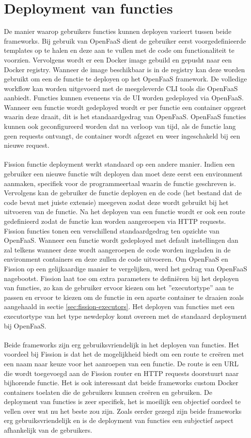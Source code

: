 \section{Deployment van functies}
De manier waarop gebruikers functies kunnen deployen varieert tussen beide frameworks. Bij gebruik van OpenFaaS dient de gebruiker eerst voorgedefinieerde templates op te halen en deze aan te vullen met de code om functionaliteit te voorzien. Vervolgens wordt er een Docker image gebuild en gepusht naar een Docker registry. Wanneer de image beschikbaar is in de registry kan deze worden gebruikt om een de functie te deployen op het OpenFaaS framework. De volledige workflow kan worden uitgevoerd met de meegeleverde CLI tools die OpenFaaS aanbiedt. Functies kunnen eveneens via de UI worden gedeployed via OpenFaaS. Wanneer een functie wordt gedeployed wordt er per functie een container opgezet waarin deze draait, dit is het standaardgedrag van OpenFaaS. OpenFaaS functies kunnen ook geconfigureerd worden dat na verloop van tijd, als de functie lang geen requests ontvangt, de container wordt afgezet en weer ingeschakeld bij een nieuwe request.
\\\\
Fission functie deployment werkt standaard op een andere manier. Indien een gebruiker een nieuwe functie wilt deployen dan moet deze eerst een environment aanmaken, specifiek voor de programmeertaal waarin de functie geschreven is. Vervolgens kan de gebruiker de functie deployen en de code (het bestand dat de code bevat met juiste extensie) meegeven zodat deze wordt gebruikt bij het uitvoeren van de functie. Na het deployen van een functie wordt er ook een route gedefinieerd zodat de functie kan worden aangeroepen via HTTP requests. Fission functies tonen een verschillend standaardgedrag ten opzichte van OpenFaaS. Wanneer een functie wordt gedeployed met default instellingen dan zal telkens wanneer deze wordt aangeroepen de code worden ingeladen in de environment containers en deze zullen de code uitvoeren. Om OpenFaaS en Fission op een gelijkaardige manier te vergelijken, werd het gedrag van OpenFaaS nagebootst. Fission laat toe om extra parameters te definiëren bij het deployen van functies, zo kan de gebruiker ervoor kiezen om het ''executortype'' aan te passen en ervoor te kiezen om de functie in een aparte container te draaien zoals aangehaald in sectie \ref{sec:fission-executors}. Het deployen van functies met een executortype van het type newdeploy komt overeen met de standaard deployment bij OpenFaaS.
\\\\
Beide frameworks zijn erg gebruiksvriendelijk in het deployen van functies. Het voordeel bij Fission is dat het de mogelijkheid biedt om een route te creëren met een naam naar keuze voor het aanroepen van een functie. De route is een URL die wordt toegevoegd aan de Fission router en HTTP requests doorstuurt naar bijhorende functie. Het is ook interessant dat beide frameworks custom Docker containers toelaten die de gebruikers kunnen creëren en gebruiken. 
De deployment van functies is zeer specifiek, het is moeilijk een objectief oordeel te vellen over wat nu het beste zou zijn. Zoals eerder gezegd zijn beide frameworks erg gebruiksvriendelijk en is de deployment van functies een subjectief aspect afhankelijk van de gebruikers.
